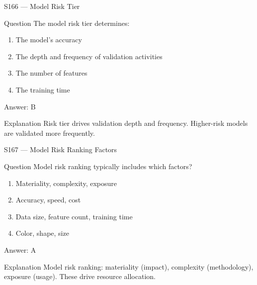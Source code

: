 \documentclass[aspectratio=169,8pt]{beamer}
\begin{document}
	\begin{frame}{S166 --- Model Risk Tier}
		\begin{block}{Question}
			The model risk tier determines:
			\begin{enumerate}
				\item The model's accuracy
				\item The depth and frequency of validation activities
				\item The number of features
				\item The training time
			\end{enumerate}
		\end{block}
		\begin{exampleblock}{Answer: B}\end{exampleblock}
		\begin{block}{Explanation}
			Risk tier drives validation depth and frequency. Higher-risk models are validated more frequently.
		\end{block}
	\end{frame}
	
	\begin{frame}{S167 --- Model Risk Ranking Factors}
		\begin{block}{Question}
			Model risk ranking typically includes which factors?
			\begin{enumerate}
				\item Materiality, complexity, exposure
				\item Accuracy, speed, cost
				\item Data size, feature count, training time
				\item Color, shape, size
			\end{enumerate}
		\end{block}
		\begin{exampleblock}{Answer: A}\end{exampleblock}
		\begin{block}{Explanation}
			Model risk ranking: materiality (impact), complexity (methodology), exposure (usage). These drive resource allocation.
		\end{block}
	\end{frame}
	
\end{document}

